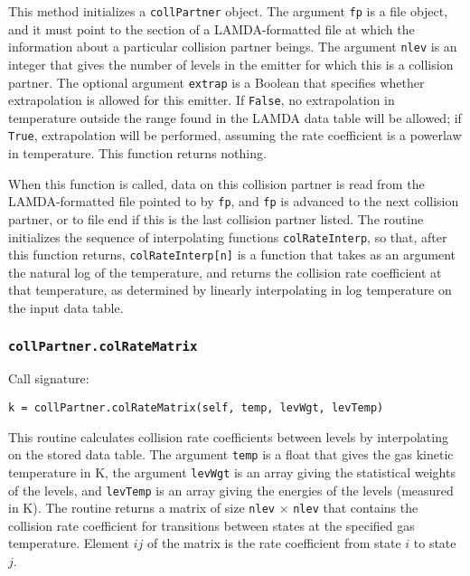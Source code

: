 \documentclass[12pt]{article}
\begin{document}
This method initializes a \verb=collPartner= object. The argument \verb=fp= is a file object, and it must point to the section of a LAMDA-formatted file at which the information about a particular collision partner beings. The argument \verb=nlev= is an integer that gives the number of levels in the emitter for which this is a collision partner. The optional argument \verb=extrap= is a Boolean that specifies whether extrapolation is allowed for this emitter. If \verb=False=, no extrapolation in temperature outside the range found in the LAMDA data table will be allowed; if \verb=True=, extrapolation will be performed, assuming the rate coefficient is a powerlaw in temperature. This function returns nothing.

When this function is called, data on this collision partner is read from the LAMDA-formatted file pointed to by \verb=fp=, and \verb=fp= is advanced to the next collision partner, or to file end if this is the last collision partner listed. The routine initializes the sequence of interpolating functions \verb=colRateInterp=, so that, after this function returns, \verb=colRateInterp[n]= is a function that takes as an argument the natural log of the temperature, and returns the collision rate coefficient at that temperature, as determined by linearly interpolating in log temperature on the input data table.

\subsubsection{\texttt{collPartner.colRateMatrix}}
\label{sec:colratematrix}

Call signature:

\begin{verbatim}
k = collPartner.colRateMatrix(self, temp, levWgt, levTemp)
\end{verbatim}

This routine calculates collision rate coefficients between levels by interpolating on the stored data table. The argument \verb=temp= is a float that gives the gas kinetic temperature in K, the argument \verb=levWgt= is an array giving the statistical weights of the levels, and \verb=levTemp= is an array giving the energies of the levels (measured in K). The routine returns a matrix of size \verb=nlev= $\times$ \verb=nlev= that contains the collision rate coefficient for transitions between states at the specified gas temperature. Element $ij$ of the matrix is the rate coefficient from state $i$ to state $j$. 
\end{document}
